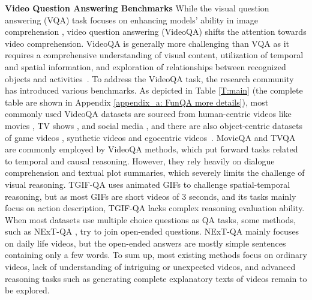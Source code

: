 \noindent\textbf{Video Question Answering Benchmarks}\quad
While the visual question answering (VQA) task focuses on enhancing models' ability in image comprehension \cite{goyal2017making, zhu2016visual7w, krishna2016visual}, video question answering (VideoQA) shifts the attention towards video comprehension. VideoQA is generally more challenging than VQA as it requires a comprehensive understanding of visual content, utilization of temporal and spatial information, and exploration of relationships between recognized objects and activities~\cite{yi2020clevrer}. To address the VideoQA task, the research community has introduced various benchmarks. As depicted in Table \ref{T:main} (the complete table are shown in Appendix \ref{appendix_a: FunQA more details}), most commonly used VideoQA datasets are sourced from human-centric videos like movies \cite{tapaswi2016movieqa}, TV shows \cite{lei2018tvqa, lei2019tvqa, garcia2020knowit}, and social media \cite{jang-IJCV-2019, zadeh2019social, xiao2021nextqanext, grundemclaughlin2021agqa, yang2022avqa, wu2021star, castro2022fiber}, and there are also object-centric datasets of game videos \cite{mun2017marioqa}, synthetic videos \cite{yi2020clevrer} and egocentric videos~\cite{Gao_2021_ICCV}. MovieQA \cite{tapaswi2016movieqa} and TVQA \cite{lei2018tvqa} are commonly employed by VideoQA methods, which put forward tasks related to temporal and causal reasoning. However, they rely heavily on dialogue comprehension and textual plot summaries, which severely limits the challenge of visual reasoning. TGIF-QA \cite{jang-IJCV-2019} uses animated GIFs to challenge spatial-temporal reasoning, but as most GIFs are short videos of 3 seconds, and its tasks mainly focus on action description, TGIF-QA lacks complex reasoning evaluation ability. When most datasets use multiple choice questions as QA tasks, some methods, such as NExT-QA \cite{xiao2021nextqanext}, try to join open-ended questions. NExT-QA mainly focuses on daily life videos, but the open-ended answers are mostly simple sentences containing only a few words. To sum up, most existing methods focus on ordinary videos, lack of understanding of intriguing or unexpected videos, and advanced reasoning tasks such as generating complete explanatory texts of videos remain to be explored.\\
